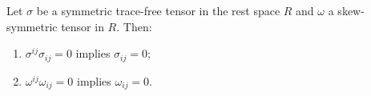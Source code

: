 Let $\sigma$ be a symmetric trace-free tensor in the rest space $R$ and $\omega$ a skew-symmetric tensor in $R$. Then:
\begin{enumerate}
    \item $\sigma^{ij} \sigma_{ij} = 0$ implies $\sigma_{ij} = 0$;
    \item $\omega^{ij} \omega_{ij} = 0$ implies $\omega_{ij} = 0$.
\end{enumerate}
